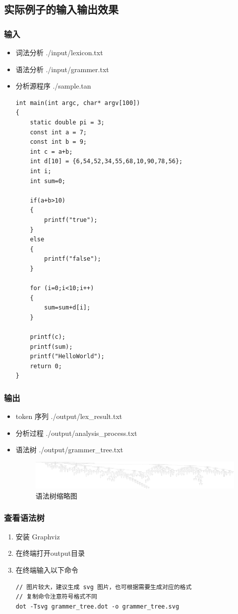 \documentclass[cs4size,a4paper]{ctexart}
\begin{document}
\subsection{实际例子的输入输出效果}
\subsubsection{输入}
\begin{itemize}
    \item 词法分析 ./input/lexicon.txt
    \item 语法分析 ./input/grammer.txt
    \item 分析源程序 ./sample.tan
    \begin{lstlisting}
int main(int argc, char* argv[100])  
{  
    static double pi = 3;
    const int a = 7;
    const int b = 9;
    int c = a+b;
    int d[10] = {6,54,52,34,55,68,10,90,78,56};
    int i;
    int sum=0;

    if(a+b>10)
    {
        printf("true");
    }
    else
    {
        printf("false");
    }

    for (i=0;i<10;i++)  
    {  
        sum=sum+d[i];
    }

    printf(c);
    printf(sum);  
    printf("HelloWorld");  
    return 0;  
}  
    \end{lstlisting}
\end{itemize}
\subsubsection{输出}
\begin{itemize}
    \item token 序列 ./output/lex\_result.txt
    \item 分析过程 ./output/analysis\_process.txt
    \item 语法树 ./output/grammer\_tree.txt
    \begin{figure}[htpb] 
        \centering
        \includegraphics[width=0.8\linewidth]{./figure/grammer_tree.png}
        \caption{语法树缩略图}
    \end{figure}
\end{itemize}
\subsubsection{查看语法树}
\begin{enumerate}
    \item 安装 Graphviz
    \item 在终端打开output目录
    \item 在终端输入以下命令
            \begin{lstlisting}
// 图片较大，建议生成 svg 图片，也可根据需要生成对应的格式
// 复制命令注意符号格式不同
dot -Tsvg grammer_tree.dot -o grammer_tree.svg 
                \end{lstlisting}
\end{enumerate}
\end{document}
